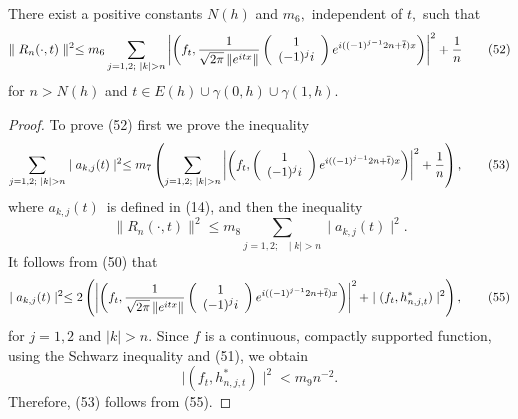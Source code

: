 \documentclass[10pt,a4paper]{amsart}
\begin{document}
\begin{lemma}
There exist a positive constants $N(h)$ and $m_{6},$ independent of $t,$ such
that
\begin{equation}
\parallel R_{n}(\cdot,t)\parallel^{2}\leq m_{6}\sum_{j=1,2;\text{ }\mid
k\mid>n}\left\vert \left(  f_{t},\frac{1}{\sqrt{2\pi}\left\Vert e^{itx}%
\right\Vert }\left(
\begin{array}
[c]{c}%
1\\
(-1)^{j}i
\end{array}
\right)  e^{i((-1)^{j-1}2n+\overline{t})x}\right)  \right\vert ^{2}+\frac
{1}{n} \tag{52}%
\end{equation}
for $n>N(h)$ and $t\in E(h)\cup\gamma(0,h)\cup\gamma(1,h).$
\end{lemma}

\begin{proof}
To prove (52) first we prove the inequality
\begin{equation}
\sum_{j=1,2;\text{ }\mid k\mid>n}\mid a_{k,j}(t)\mid^{2}\leq m_{7}\left(
\sum_{j=1,2;\text{ }\mid k\mid>n}\left\vert \left(  f_{t},\left(
\begin{array}
[c]{c}%
1\\
(-1)^{j}i
\end{array}
\right)  e^{i((-1)^{j-1}2n+\overline{t})x}\right)  \right\vert ^{2}+\frac
{1}{n}\right)  , \tag{53}%
\end{equation}
where $a_{k,j}(t)$\ is defined in (14), and then the inequality
\begin{equation}
\parallel R_{n}(\cdot,t)\parallel^{2}\leq m_{8}\sum_{j=1,2;\text{ }\mid
k\mid>n}\mid a_{k,j}(t)\mid^{2}. \tag{54}%
\end{equation}
It follows from (50) that
\begin{equation}
\mid a_{k,j}(t)\mid^{2}\leq2\left(  \left\vert \left(  f_{t},\frac{1}%
{\sqrt{2\pi}\left\Vert e^{itx}\right\Vert }\left(
\begin{array}
[c]{c}%
1\\
(-1)^{j}i
\end{array}
\right)  e^{i((-1)^{j-1}2n+\overline{t})x}\right)  \right\vert ^{2}+\mid
(f_{t},h_{n,j,t}^{\ast})\mid^{2}\right)  , \tag{55}%
\end{equation}
for $j=1,2$ and $\mid k\mid>n.$ Since $f$ is a continuous, compactly supported
function, using the Schwarz inequality and (51), we obtain
\begin{equation}
\mid(f_{t},h_{n,j,t}^{\ast})\mid^{2}<m_{9}n^{-2}. \tag{56}%
\end{equation}
Therefore, (53) follows from (55).


\end{proof}
\end{document}
